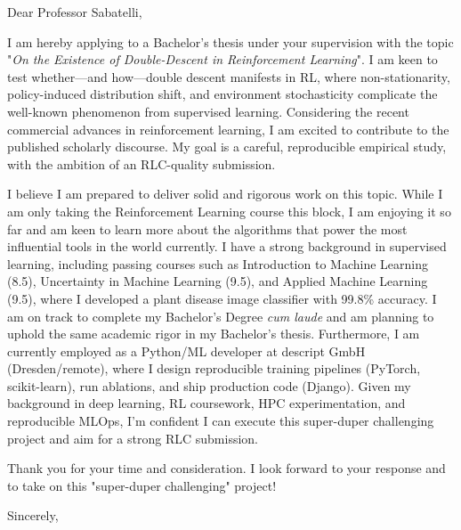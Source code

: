 \documentclass[a4paper,11pt]{letter}
\begin{document}
\begin{letter}{}

\opening{Dear Professor Sabatelli,}

I am hereby applying to a Bachelor's thesis under your supervision with the topic "\textit{On the Existence of Double-Descent in Reinforcement Learning}". I am keen to test whether—and how—double descent manifests in RL, where non-stationarity, policy-induced distribution shift, and environment stochasticity complicate the well-known phenomenon from supervised learning. Considering the recent commercial advances in reinforcement learning, I am excited to contribute to the published scholarly discourse. My goal is a careful, reproducible empirical study, with the ambition of an RLC-quality submission.

I believe I am prepared to deliver solid and rigorous work on this topic. While I am only taking the Reinforcement Learning course this block, I am enjoying it so far and am keen to learn more about the algorithms that power the most influential tools in the world currently. I have a strong background in supervised learning, including passing courses such as Introduction to Machine Learning (8.5), Uncertainty in Machine Learning (9.5), and Applied Machine Learning (9.5), where I developed a plant disease image classifier with 99.8\% accuracy. I am on track to complete my Bachelor's Degree \textit{cum laude} and am planning to uphold the same academic rigor in my Bachelor's thesis. Furthermore, I am currently employed as a Python/ML developer at descript GmbH (Dresden/remote), where I design reproducible training pipelines (PyTorch, scikit-learn), run ablations, and ship production code (Django). Given my background in deep learning, RL coursework, HPC experimentation, and reproducible MLOps, I'm confident I can execute this super-duper challenging project and aim for a strong RLC submission.

Thank you for your time and consideration. I look forward to your response and to take on this "super-duper challenging" project!

\closing{Sincerely,}

\end{letter}
\end{document}
